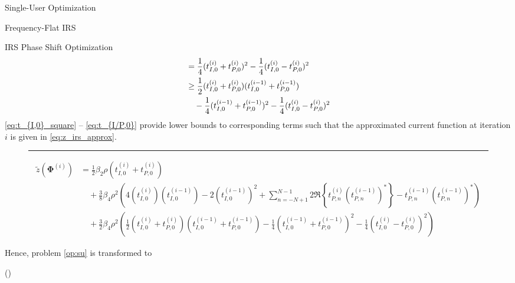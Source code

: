 \documentclass{IEEEtran}
\begin{document}
\begin{section}{Single-User Optimization}
\begin{subsection}{Frequency-Flat IRS}
\begin{subsubsection}{IRS Phase Shift Optimization}
\begin{align}
				& = \frac{1}{4}(t_{I,0}^{(i)} + t_{P,0}^{(i)})^2 - \frac{1}{4}(t_{I,0}^{(i)} - t_{P,0}^{(i)})^2\nonumber\\
				& \ge \frac{1}{2}(t_{I,0}^{(i)} + t_{P,0}^{(i)})(t_{I,0}^{(i-1)} + t_{P,0}^{(i-1)})\nonumber\\
				& \quad - \frac{1}{4}(t_{I,0}^{(i-1)} + t_{P,0}^{(i-1)})^2 - \frac{1}{4}(t_{I,0}^{(i)} - t_{P,0}^{(i)})^2\label{eq:t_{I/P,0}}
			\end{align}
			\ref{eq:t_{I,0}_square} -- \ref{eq:t_{I/P,0}} provide lower bounds to corresponding terms such that the approximated current function at iteration $i$ is given in \ref{eq:z_irs_approx}.
			\begin{figure*}[b]
				\hrule
				\begin{equation}\label{eq:z_irs_approx}
					\begin{split}
						\tilde{z}(\boldsymbol{\Phi}^{(i)})
						& = \frac{1}{2}{\beta_2}{\rho}(t_{I,0}^{(i)}+t_{P,0}^{(i)})\\
						& \quad + \frac{3}{8}{\beta_4}{\rho^2} \left(4 (t_{I,0}^{(i)})(t_{I,0}^{(i-1)}) - 2 (t_{I,0}^{(i-1)})^2 + \sum_{n=-N+1}^{N-1}{2 \Re\left\{t_{P,n}^{(i)} (t_{P,n}^{(i-1)})^*\right\} - t_{P,n}^{(i-1)} (t_{P,n}^{(i-1)})^*}\right)\\
						& \quad + \frac{3}{2}{\beta_4}{\rho^2} \left(\frac{1}{2}(t_{I,0}^{(i)} + t_{P,0}^{(i)})(t_{I,0}^{(i-1)} + t_{P,0}^{(i-1)}) - \frac{1}{4}(t_{I,0}^{(i-1)} + t_{P,0}^{(i-1)})^2 - \frac{1}{4}(t_{I,0}^{(i)} - t_{P,0}^{(i)})^2\right)
					\end{split}
				\end{equation}
			\end{figure*}
			Hence, problem \ref{op:su} is transformed to
			\begin{maxi!}
				{\boldsymbol{\boldsymbol{\Phi}}}{(\boldsymbol{\Phi})}{\label{op:su_irs}}{\label{eq:su_irs_target}}
			\end{maxi!}

\end{subsubsection}
\end{subsection}
\end{section}
\end{document}
